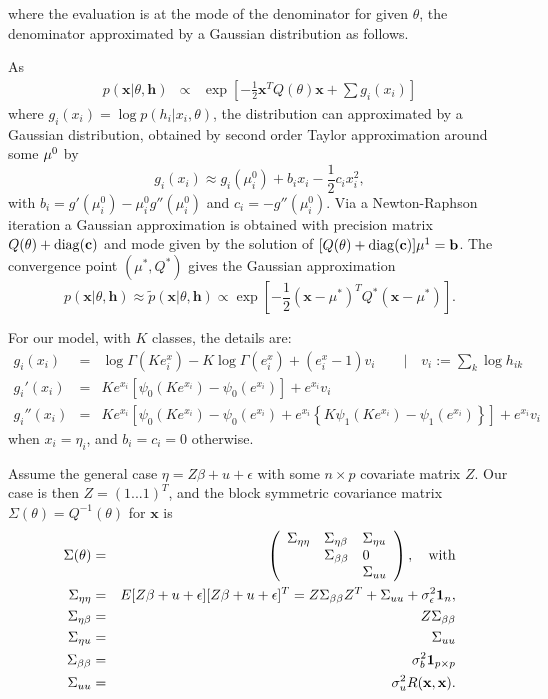 \documentclass[10pt, onecolumn]{article}
\newcommand{\x}{\mathbf{x}}
\newcommand{\y}{\mathbf{h}}
\begin{document}
where the evaluation is at the mode of the denominator for given $\theta$, the denominator approximated by a Gaussian distribution as follows.

As
\begin{eqnarray}
p(\x | \theta, \y)&\propto& \exp \left[-\frac{1}{2}\x^T Q(\theta)\x + \sum g_i(x_i) \right]
\end{eqnarray}
where $g_i(x_i)=\log p(h_i|x_i,\theta)$, the distribution can approximated by a Gaussian distribution, obtained by second order Taylor approximation around some $\bold\mu^0$ by
\[
g_i(x_i)\approx g_i(\mu_i^0) + b_i x_i - \frac{1}{2}c_i x_i^2,
\]
with $b_i = g'(\mu_i^0)- \mu_i^0 g''(\mu_i^0)$ and $c_i=-g''(\mu_i^0)$. Via a Newton-Raphson iteration a Gaussian approximation is obtained with precision matrix $Q(\theta)+\mathrm{diag}(\bold c)$ and mode given by the solution of $[Q(\theta) + \mathrm{diag}(\bold c)]\bold\mu^1=\bold b$. 
The convergence point $(\mu^*, Q^*)$ gives the Gaussian approximation
\begin{equation}
p(\x|\theta, \y)\approx \tilde p(\x|\theta, \y) \propto \exp \left[-\frac{1}{2}(\x-\mu^*)^T Q^*(\x-\mu^*)\right].
\end{equation}

For our model, with $K$ classes, the details are:
\begin{eqnarray}
g_i(x_i) &=& \log \Gamma(Ke^x_i) - K\log \Gamma(e^x_i) +(e^x_i - 1) v_i \qquad |\quad  v_i := \sum_k \log h_{ik}\\
g_i'(x_i) &=& Ke^{x_i}\left[\psi_0(Ke^{x_i})-\psi_0(e^{x_i})\right]+e^{x_i} v_i\\
g_i''(x_i)&=& Ke^{x_i}\left[\psi_0(Ke^{x_i})-\psi_0(e^{x_i}) + e^{x_i}\left\{K\psi_1(Ke^{x_i})-\psi_1(e^{x_i})\right\}\right] + e^{x_i}v_i
\end{eqnarray}
when $x_i=\eta_i$, and $b_i=c_i=0$ otherwise. 

Assume the general case $\eta=Z\beta + u + \epsilon$ with some $n\times p$ covariate matrix $Z$. Our case is then $Z=(1...1)^T$, and the block symmetric covariance matrix $\Sigma(\theta)=Q^{-1}(\theta)$ for $\x$ is
\begin{eqnarray}
\Sigma(\theta) &=& \left(\begin{array}{lll} \Sigma_{\eta\eta} & \Sigma_{\eta\beta} & \Sigma_{\eta u}\\  & \Sigma_{\beta\beta}& 0 \\
& & \Sigma_{uu} \end{array}\right), \quad\mathrm{with}\\
\Sigma_{\eta\eta} &=& E[Z\beta+u+\epsilon][Z\beta+u+\epsilon]^T = Z\Sigma_{\beta\beta}Z^T + \Sigma_{uu} + \sigma_\epsilon^2 \bold 1_{n}, \\
\Sigma_{\eta\beta} &=& Z\Sigma_{\beta\beta}\\
\Sigma_{\eta u}&=&\Sigma_{uu} \\
\Sigma_{\beta\beta}&=&\sigma^2_b \bold 1_{p\times p}\\
\Sigma_{uu} &=& \sigma_u^2 R(\x,\x).
\end{eqnarray}
\end{document}
